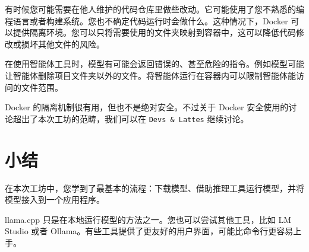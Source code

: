 \documentclass[a4paper,12pt]{article}
\begin{document}
有时候您可能需要在他人维护的代码仓库里做些改动。它可能使用了您不熟悉的编程语言或者构建系统。您也不确定代码运行时会做什么。这种情况下，Docker 可以提供隔离环境。您可以只将需要使用的文件夹映射到容器中，这可以降低代码修改或损坏其他文件的风险。

在使用智能体工具时，模型有可能会返回错误的、甚至危险的指令。例如模型可能让智能体删除项目文件夹以外的文件。将智能体运行在容器内可以限制智能体能访问的文件范围。

Docker 的隔离机制很有用，但也不是绝对安全。不过关于 Docker 安全使用的讨论超出了本次工坊的范畴，我们可以在 \texttt{Devs \& Lattes} 继续讨论。

\section{小结}

在本次工坊中，您学到了最基本的流程：下载模型、借助推理工具运行模型，并将模型接入到一个应用程序。

llama.cpp 只是在本地运行模型的方法之一。您也可以尝试其他工具，比如 LM Studio 或者 Ollama。有些工具提供了更友好的用户界面，可能比命令行更容易上手。
\end{document}
